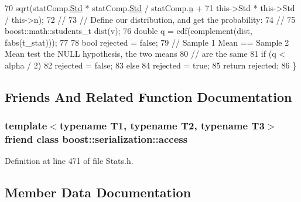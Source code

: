 \begin{DoxyCode}
70                     sqrt(statComp.\hyperlink{class_soil_math_1_1_stats_a6af590b7d033d882d5428c0d7a1f5e59}{Std} * statComp.\hyperlink{class_soil_math_1_1_stats_a6af590b7d033d882d5428c0d7a1f5e59}{Std} / statComp.\hyperlink{class_soil_math_1_1_stats_a7bc57af334b68253832ebac17f85d091}{n} +
71                          this->Std * this->Std / this->n);
72     \textcolor{comment}{//}
73     \textcolor{comment}{// Define our distribution, and get the probability:}
74     \textcolor{comment}{//}
75     boost::math::students\_t dist(v);
76     \textcolor{keywordtype}{double} q = cdf(complement(dist, fabs(t\_stat)));
77 
78     \textcolor{keywordtype}{bool} rejected = \textcolor{keyword}{false};
79     \textcolor{comment}{// Sample 1 Mean == Sample 2 Mean test the NULL hypothesis, the two means}
80     \textcolor{comment}{// are the same}
81     \textcolor{keywordflow}{if} (q < alpha / 2)
82       rejected = \textcolor{keyword}{false};
83     \textcolor{keywordflow}{else}
84       rejected = \textcolor{keyword}{true};
85     \textcolor{keywordflow}{return} rejected;
86   \}
\end{DoxyCode}


\subsection{Friends And Related Function Documentation}
\hypertarget{class_soil_math_1_1_stats_ac98d07dd8f7b70e16ccb9a01abf56b9c}{}
\subsubsection[{boost\+::serialization\+::access}]{\setlength{\rightskip}{0pt plus 5cm}template$<$typename T1, typename T2, typename T3$>$ friend class boost\+::serialization\+::access\hspace{0.3cm}{\ttfamily [friend]}}\label{class_soil_math_1_1_stats_ac98d07dd8f7b70e16ccb9a01abf56b9c}


Definition at line 471 of file Stats.\+h.



\subsection{Member Data Documentation}
\hypertarget{class_soil_math_1_1_stats_a00be1d2a705a8aba532fbe726001bbb2}{}
